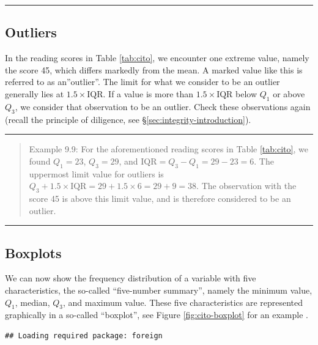 \documentclass[
]{book}
\begin{document}
\begin{center}\rule{0.5\linewidth}{0.5pt}\end{center}

\subsection{Outliers}\label{sec:outliers}

In the reading scores in Table \ref{tab:cito}, we encounter one extreme value, namely the score 45, which differs markedly from the mean. A marked value like this is referred to as an''outlier''. The limit for what we consider to be an outlier
generally lies at \(1.5 \times \textrm{IQR}\). If a value is more than
\(1.5 \times \textrm{IQR}\) below \(Q_1\) or above \(Q_3\), we consider that
observation to be an outlier. Check these observations again (recall the principle of diligence, see §\ref{sec:integrity-introduction}).

\begin{center}\rule{0.5\linewidth}{0.5pt}\end{center}

\begin{quote}
Example 9.9:
For the aforementioned reading scores in
Table \ref{tab:cito}, we found
\(Q_1=23\), \(Q_3=29\), and \(\textrm{IQR}=Q_3-Q_1=29-23=6\). The uppermost
limit value for outliers is
\(Q_3 + 1.5 \times \textrm{IQR} = 29 + 1.5 \times 6 = 29+9 = 38\). The
observation with the score 45 is above this limit value, and is therefore
considered to be an outlier.
\end{quote}

\begin{center}\rule{0.5\linewidth}{0.5pt}\end{center}

\subsection{Boxplots}\label{sec:boxplot}

We can now show the frequency distribution of a variable with five
characteristics, the so-called ``five-number summary'', namely the minimum value, \(Q_1\),
median, \(Q_3\), and maximum value. These five characteristics are represented graphically
in a so-called ``boxplot'', see
Figure \ref{fig:cito-boxplot}
for an example \citep[ §2C]{Tukey77}.

\begin{verbatim}
## Loading required package: foreign
\end{verbatim}
\end{document}
